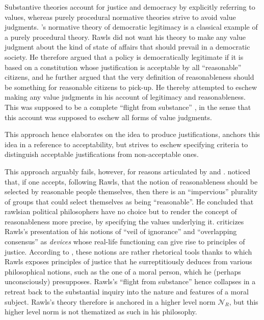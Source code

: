 \documentclass[preprint, french, english, 11pt, authoryear]{elsarticle}%
\newcommand{\possessivecite}[1]{\citeauthor{#1}’s \citeyearpar{#1}}
\begin{document}
Substantive theories account for justice and democracy by explicitly referring to values, whereas purely procedural normative theories strive to avoid value judgments. 
\possessivecite{rawls_political_2005} normative theory of democratic legitimacy is a classical example of a purely procedural theory. 
Rawls did not want his theory to make any value judgment about the kind of state of affairs that should prevail in a democratic society. 
He therefore argued that a policy is democratically legitimate if it is based on a constitution whose justification is acceptable by all  “reasonable” citizens, and he further argued that the very definition of reasonableness should be something for reasonable citizens to pick-up. 
He thereby attempted to eschew making any value judgments in his account of legitimacy and reasonableness. 
This was supposed to be a complete ``flight from substance'' \citep{estlund_democratic_2009}, in the sense that this account was supposed to eschew all forms of value judgments.

This approach hence elaborates on the idea to produce justifications, anchors this idea in a reference to acceptability, but strives to eschew specifying criteria to distinguish acceptable justifications from non-acceptable ones.

This approach arguably fails, however, for reasons articulated by \citeauthor{habermas_reconciliation_1995} and \citeauthor{estlund_democratic_2009}. 
\citet{estlund_democratic_2009} noticed that, if one accepts, following Rawls, that the notion of reasonableness should be selected by reasonable people themselves, then there is an “impervious” plurality of groups that could select themselves as being “reasonable”. 
He concluded that rawlsian political philosophers have no choice but to render the concept of reasonableness more precise, by specifying the values underlying it. 
\cite{habermas_reconciliation_1995} criticizes Rawls's presentation of his notions of “veil of ignorance” and  “overlapping consensus” as \emph{devices} whose real-life functioning can give rise to principles of justice. 
According to \cite{habermas_reconciliation_1995}, these notions are rather rhetorical tools thanks to which Rawls exposes principles of justice that he surreptitiously deduces from various philosophical notions, such as the one of a moral person, which he (perhaps unconsciously) presupposes. 
Rawls's ``flight from substance'' hence collapses in a retreat back to the substantial inquiry into the nature and features of a moral subject.  Rawls's theory therefore is anchored in a higher level norm $\mathscr{N}_R$, but this higher level norm is not thematized as such in his philosophy.
\end{document}
